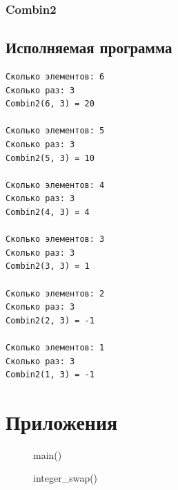 \documentclass[12pt, a4paper]{article}
\begin{document}
\subsubsection{Combin2}



\subsection{Исполняемая программа}

\begin{verbatim}
Сколько элементов: 6
Сколько раз: 3    
Combin2(6, 3) = 20

Сколько элементов: 5
Сколько раз: 3
Combin2(5, 3) = 10

Сколько элементов: 4
Сколько раз: 3
Combin2(4, 3) = 4

Сколько элементов: 3
Сколько раз: 3
Combin2(3, 3) = 1

Сколько элементов: 2
Сколько раз: 3
Combin2(2, 3) = -1

Сколько элементов: 1
Сколько раз: 3
Combin2(1, 3) = -1
\end{verbatim}

\labconclusion{}

\newpage

\section{Приложения}

\begin{figure}[h]
    \caption{main()}
    \label{fig:a_25_main}
\end{figure}

\begin{figure}[h]
    \caption{integer\_swap()}
    \label{fig:a_25_integer_swap}
\end{figure}
\end{document}
